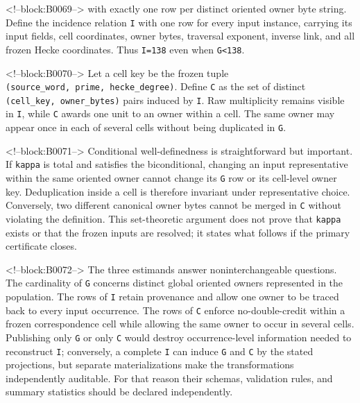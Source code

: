 \documentclass[11pt]{article}
\begin{document}
<!--block:B0069-->
with exactly one row per distinct oriented owner byte string. Define the
incidence relation \texttt{I} with one row for every input instance,
carrying its input fields, cell coordinates, owner bytes, traversal
exponent, inverse link, and all frozen Hecke coordinates. Thus
\texttt{\textbar{}I\textbar{}=138} even when
\texttt{\textbar{}G\textbar{}\textless{}138}.

<!--block:B0070-->
Let a cell key be the frozen tuple
\texttt{(source\_word,\ prime,\ hecke\_degree)}. Define \texttt{C} as
the set of distinct \texttt{(cell\_key,\ owner\_bytes)} pairs induced by
\texttt{I}. Raw multiplicity remains visible in \texttt{I}, while
\texttt{C} awards one unit to an owner within a cell. The same owner may
appear once in each of several cells without being duplicated in
\texttt{G}.

<!--block:B0071-->
Conditional well-definedness is straightforward but important. If
\texttt{kappa} is total and satisfies the biconditional, changing an
input representative within the same oriented owner cannot change its
\texttt{G} row or its cell-level owner key. Deduplication inside a cell
is therefore invariant under representative choice. Conversely, two
different canonical owner bytes cannot be merged in \texttt{C} without
violating the definition. This set-theoretic argument does not prove
that \texttt{kappa} exists or that the frozen inputs are resolved; it
states what follows if the primary certificate closes.

<!--block:B0072-->
The three estimands answer noninterchangeable questions. The cardinality
of \texttt{G} concerns distinct global oriented owners represented in
the population. The rows of \texttt{I} retain provenance and allow one
owner to be traced back to every input occurrence. The rows of
\texttt{C} enforce no-double-credit within a frozen correspondence cell
while allowing the same owner to occur in several cells. Publishing only
\texttt{G} or only \texttt{C} would destroy occurrence-level information
needed to reconstruct \texttt{I}; conversely, a complete \texttt{I} can
induce \texttt{G} and \texttt{C} by the stated projections, but separate
materializations make the transformations independently auditable. For
that reason their schemas, validation rules, and summary statistics
should be declared independently.
\end{document}
